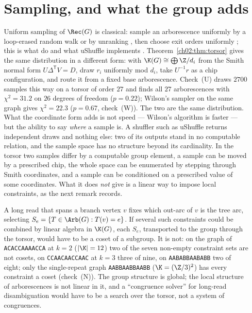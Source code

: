 \section{Sampling, and what the group adds}\label{ch02:sec:sampling}

Uniform sampling of $\Rec(G)$ is classical: sample an arborescence uniformly by a
loop-erased random walk \cite{Wilson,PW} or by unranking \cite{CMN}, then choose exit
orders uniformly \cite{CC}; this is what \cite{AE,KMUW} do and what uShuffle implements
\cite{uShuffle}. Theorem~\ref{ch02:thm:torsor} gives the same distribution in a different form:
with $\K(G)\cong\bigoplus\Z/d_i$ from the Smith normal form $U\Delta^{\mathsf T}V=D$, draw
$r_i$ uniformly mod $d_i$, take $U^{-1}r$ as a chip configuration, and route it from a
fixed base arborescence. Check~(U) draws $2700$ samples this way on a torsor of order $27$
and finds all $27$ arborescences with $\chi^{2}=31.2$ on $26$ degrees of freedom
($p=0.22$); Wilson's sampler on the same graph gives $\chi^{2}=22.3$ ($p=0.67$,
check~(W)). The two are the same
distribution. What the coordinate form adds is not speed --- Wilson's algorithm is faster
--- but the ability to say \emph{where} a sample is. A shuffler such as uShuffle returns
independent draws and nothing else: two of its outputs stand in no computable relation,
and the sample space has no structure beyond its cardinality. In the torsor two samples
differ by a computable group element, a sample can be moved by a prescribed chip, the
whole space can be enumerated by stepping through Smith coordinates, and a sample can be
conditioned on a prescribed value of some coordinates. What it does \emph{not} give is a
linear way to impose local constraints, as the next remark records.

\begin{remark}\label{ch02:rem:cosets}
A long read that spans a branch vertex $v$ fixes which out-arc of $v$ is the tree arc,
selecting $S_{e}=\{T\in\Arb(G):T(v)=e\}$. If several such constraints could be combined
by linear algebra in $\K(G)$, each $S_e$, transported to the group through the torsor,
would have to be a coset of a subgroup. It is not: on the graph of \texttt{ACACCAAAACCA}
at $k=2$ ($|\K|=12$) two of the seven non-empty constraint sets are not cosets, on
\texttt{CCAACAACCAAC} at $k=3$ three of nine, on \texttt{AABABBAABABB} two of eight;
only the single-repeat graph \texttt{AABBAABBAABB} ($\K=(\Z/3)^{2}$) has every
constraint a coset (check~(N)). The group structure is global; the local structure of
arborescences is not linear in it, and a ``congruence solver'' for long-read
disambiguation would have to be a search over the torsor, not a system of congruences.
\end{remark}

